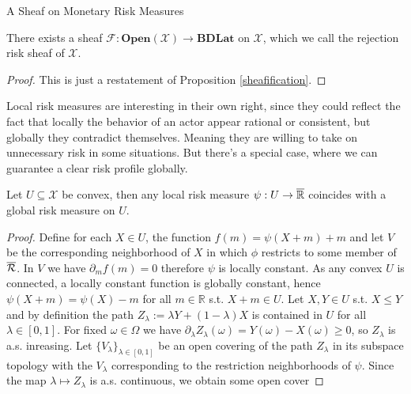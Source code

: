 \begin{subsection}{A Sheaf on Monetary Risk Measures}
    \begin{corollary}
        There exists a sheaf \( \mathcal{F} : \textbf{Open}(\mathcal{X}) \to \textbf{BDLat} \) on \( \mathcal{X} \),
        which we call the rejection risk sheaf of \( \mathcal{X} \).
    \end{corollary}
    \begin{proof}
        This is just a restatement of Proposition \ref{sheafification}.
    \end{proof}
    Local risk measures are interesting in their own right, since they could reflect the fact that locally the behavior of an actor
    appear rational or consistent, but globally they contradict themselves. Meaning they are willing to take on unnecessary risk in some situations.
    But there's a special case, where we can guarantee a clear risk profile globally.
    \begin{proposition}
        Let \( U \subseteq \mathcal{X} \) be convex, then any local risk measure \( \psi : U \to \overline{\mathbb{R}} \) coincides with a global risk measure
        on \( U \).
    \end{proposition}
    \begin{proof}
        Define for each \( X \in U \), the function \( f(m) = \psi(X + m) + m \) and let \( V \) be the corresponding neighborhood of \( X \)
        in which \( \phi \) restricts to some member of \( \overline{\mathcal{R}} \). In \( V \) we have \( \partial_m f(m) = 0 \) therefore \( \psi \) is locally constant.
        As any convex \( U \) is connected, a locally constant function is globally constant, hence \( \psi(X + m) = \psi(X) - m \) for all \( m \in \mathbb{R} \)
        s.t. \( X + m \in U \).
        \newline
        \newline
        Let \( X, Y \in U \) s.t. \( X \leq Y \) and by definition the path \( Z_\lambda := \lambda Y + (1 - \lambda)X \) is contained in \( U \) for all \( \lambda \in [0, 1] \).
        For fixed \( \omega \in \Omega \) we have \( \partial_\lambda Z_\lambda(\omega) = Y(\omega) - X(\omega) \geq 0 \), so \( Z_\lambda \) is a.s. inreasing.
        Let \( \{ V_\lambda \}_{\lambda \in [0, 1]} \) be an open covering of the path \( Z_\lambda \) in its subspace topology with the \( V_\lambda \) 
        corresponding to the restriction neighborhoods of \( \psi \). Since the map \( \lambda \mapsto Z_\lambda \) is a.s. continuous, we obtain some open cover

\end{proof}
\end{subsection}
